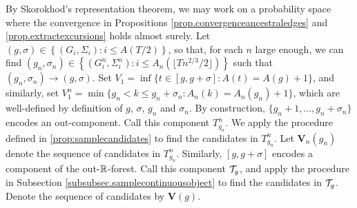 By Skorokhod's representation theorem, we may work on a probability space where the convergence in Propositions \ref{prop.convergenceancestraledges} and \ref{prop.extractexcursions} holds almost surely. Let $(g,\sigma)\in \left\{(G_i,\Sigma_i):i\leq A(T/2)\right\}$, so that, for each $n$ large enough, we can find $(g_n,\sigma_n)\in\left\{(G_i^n,\Sigma_i^n):i\leq A_n\left(\lfloor Tn^{2/3}/2\rfloor\right)\right\}$ such that $(g_n,\sigma_n)\to (g,\sigma)$. Set $V_1=\inf\{t\in [g,g+\sigma]:A(t)=A(g)+1\}$, and similarly, set $V_1^n=\min\{g_n<k\leq g_n+\sigma_n:A_n(k)=A_n(g_n)+1\}$, which are well-defined by definition of $g$, $\sigma$, $g_n$ and $\sigma_n$. By construction, $\{g_n+1,\dots,g_n+\sigma_n\}$ encodes an out-component. Call this component $T^n_{g_n}$. We apply the procedure defined in \cref{prop:samplecandidates} to find the candidates in $T^n_{g_n}$. Let $\mathbf{V}_n(g_n)$ denote the sequence of candidates in $T^n_{g_n}$. Similarly, $[g,g+\sigma]$ encodes a component of the out-${\mathbb R}$-forest. Call this component ${\mathcal T}_g$, and apply the procedure in Subsection \ref{subsubsec.samplecontinuousobject} to find the candidates in ${\mathcal T}_g$. Denote the sequence of candidates by $\mathbf{V}(g)$. 

